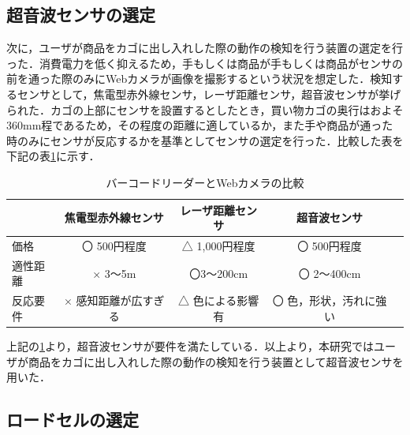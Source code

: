 \subsection{超音波センサの選定}


次に，ユーザが商品をカゴに出し入れした際の動作の検知を行う装置の選定を行った．消費電力を低く抑えるため，手もしくは商品が手もしくは商品がセンサの前を通った際のみにWebカメラが画像を撮影するという状況を想定した．検知するセンサとして，焦電型赤外線センサ，レーザ距離センサ，超音波センサが挙げられた．カゴの上部にセンサを設置するとしたとき，買い物カゴの奥行はおよそ360mm程であるため，その程度の距離に適しているか，また手や商品が通った時のみにセンサが反応するかを基準としてセンサの選定を行った．比較した表を下記の表\ref{kyori}に示す．


\begin{table}[htb]
\begin{center}
\caption{バーコードリーダーとWebカメラの比較}
\begin{tabular}{|l|c|c|c|c|} \hline
 & 焦電型赤外線センサ & レーザ距離センサ & 超音波センサ \\ \hline \hline
価格 & 〇 500円程度 & △ 1,000円程度 & 〇 500円程度 \\
適性距離 & × 3～5m & 〇3～200cm & 〇 2～400cm \\ 
反応要件 & × 感知距離が広すぎる & △ 色による影響有 & 〇 色，形状，汚れに強い \\ \hline
\end{tabular}
\label{kyori}
\end{center}
\end{table}

上記の\ref{kyori}より，超音波センサが要件を満たしている．以上より，本研究ではユーザが商品をカゴに出し入れした際の動作の検知を行う装置として超音波センサを用いた．


\subsection{ロードセルの選定}